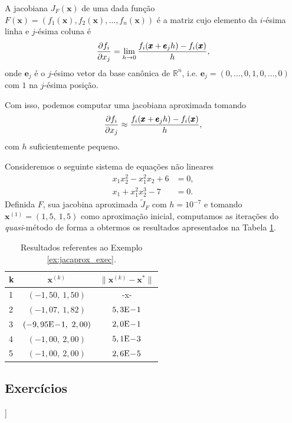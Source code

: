 A jacobiana $J_F(\pmb{x})$ de uma dada função $F(\pmb{x}) = (f_1(\pmb{x}), f_2(\pmb{x}), \dotsc, f_n(\pmb{x}))$ é a matriz cujo elemento da $i$-ésima linha e $j$-ésima coluna é
\begin{equation}
  \frac{\partial f_i}{\partial x_j} = \lim_{h\to 0} \frac{f_i(\pmb{x}+\pmb{e}_jh) - f_i(\pmb{x})}{h},
\end{equation}
onde $\pmb{e}_j$ é o $j$-ésimo vetor da base canônica de $\mathbb{R}^n$, i.e. $\pmb{e}_j = (0, \dotsc, 0, 1, 0, \dotsc, 0)$ com $1$ na $j$-ésima posição.

Com isso, podemos computar uma jacobiana aproximada tomando
\begin{equation}
  \frac{\partial f_i}{\partial x_j} \approx \frac{f_i(\pmb{x}+\pmb{e}_jh) - f_i(\pmb{x})}{h},
\end{equation}
com $h$ suficientemente pequeno.

\begin{ex}\label{ex:jacaprox_exec}
  Consideremos o seguinte sistema de equações não lineares
  \begin{align}
    x_1x_2^2 - x_1^2x_2 + 6 &= 0,\\
    x_1 + x_1^2x_2^3 - 7 &= 0.
  \end{align}
  Definida $F$, sua jacobina aproximada $\tilde{J}_F$ com $h=10^{-7}$ e tomando $\pmb{x}^{(1)} = (1,5,~1,5)$ como aproximação inicial, computamos as iterações do {\it quasi}-método de forma a obtermos os resultados apresentados na Tabela \ref{tab:ex_jacaprox_exec}.

  \begin{table}[h!]
    \centering
    \begin{tabular}{lcc}
      k & $\pmb{x}^{(k)}$ & $\|\pmb{x}^{(k)} - \pmb{x}^*\|$\\\hline
      1 & $(-1,50,~1,50)$ & -x- \\
      2 & $(-1,07,~1,82)$ & $5,3\mathrm{E}\!-\!1$\\
      3 & $(-9,95\mathrm{E}\!-\!1,~2,00)$ & $2,0\mathrm{E}\!-\!1$\\
      4 & $(-1,00,~2,00)$ & $5,1\mathrm{E}\!-\!3$\\
      5 & $(-1,00,~2,00)$ & $2,6\mathrm{E}\!-\!5$\\\hline
    \end{tabular}
    \caption{Resultados referentes ao Exemplo \ref{ex:jacaprox_exec}.}
    \label{tab:ex_jacaprox_exec}
  \end{table}

% 
\end{ex}

\subsection{Exercícios}

\begin{flushleft}
  [[tag:construcao]]
\end{flushleft}
